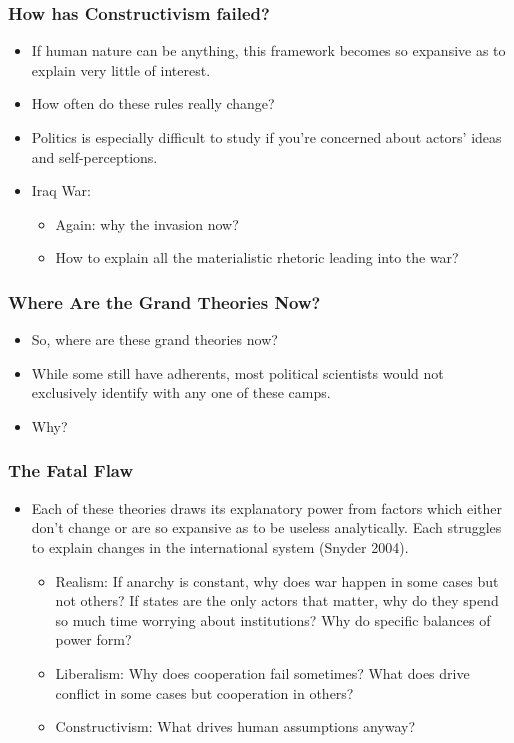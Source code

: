\documentclass[handout]{beamer}
\begin{document}
\begin{frame} 
\frametitle{\LARGE{How has Constructivism failed?}}
\begin{itemize}
    \item If human nature can be anything, this framework becomes so expansive as to explain very little of interest. \pause
    \item How often do these rules really change? \pause 
    \item Politics is especially difficult to study if you're concerned about actors' ideas and self-perceptions. 
    \item Iraq War: \pause 
    \begin{itemize}
        \item Again: why the invasion now? \pause
        \item How to explain all the materialistic rhetoric leading into the war? \pause
    \end{itemize}
\end{itemize}
\end{frame}

\begin{frame} 
\frametitle{\LARGE{Where Are the Grand Theories Now?}}
\begin{itemize}
    \item So, where are these grand theories now? \pause
    \item While some still have adherents, most political scientists would not exclusively identify with any one of these camps. \pause
    \item Why? 
\end{itemize}
\end{frame}

\begin{frame} 
	\frametitle{\LARGE{The Fatal Flaw}}
	\begin{itemize}
		\item Each of these theories draws its explanatory power from factors which either don't change or are so expansive as to be useless analytically. Each struggles to explain changes in the international system (Snyder 2004). \pause
		\begin{itemize}
			\item Realism: If anarchy is constant, why does war happen in some cases but not others? If states are the only actors that matter, why do they spend so much time worrying about institutions? Why do specific balances of power form? \pause
			\item Liberalism: Why does cooperation fail sometimes? What does drive conflict in some cases but cooperation in others? \pause
			\item Constructivism: What drives human assumptions anyway?
		\end{itemize}
	\end{itemize}
\end{frame}
\end{document}
